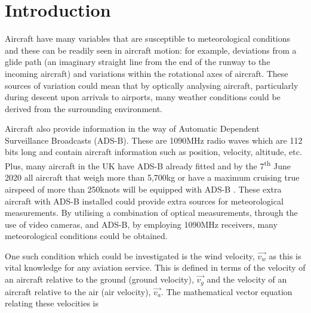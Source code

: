 \documentclass[11pt]{article}
\begin{document}
\newpage
\tableofcontents
\thispagestyle{empty} %
\twocolumn

\vspace{5mm} %





\setcounter{page}{1} %

\newpage


\section{Introduction}
\label{sec:introduction}

Aircraft have many variables that are susceptible to meteorological conditions and these can be readily seen in aircraft motion: for example, deviations from a glide path (an imaginary straight line from the end of the runway to the incoming aircraft) and variations within the rotational axes of aircraft. These sources of variation could mean that by optically analysing aircraft, particularly during descent upon arrivals to airports, many weather conditions could be derived from the surrounding environment.

Aircraft also provide information in the way of Automatic Dependent Surveillance Broadcasts (ADS-B). These are 1090MHz radio waves which are 112 bits long \cite{Book01} and contain aircraft information such as position, velocity, altitude, etc. Plus, many aircraft in the UK have ADS-B already fitted and by the 7\textsuperscript{th} June 2020 all aircraft that weigh more than 5,700kg or have a maximum cruising true airspeed of more than 250knots will be equipped with ADS-B \cite{Web03}. These extra aircraft with ADS-B installed could provide extra sources for meteorological measurements. By utilising a combination of optical measurements, through the use of video cameras, and ADS-B, by employing 1090MHz receivers, many meteorological conditions could be obtained.

One such condition which could be investigated is the wind velocity, $\Vec{v_w}$ as this is vital knowledge for any aviation service. This is defined in terms of the velocity of an aircraft relative to the ground (ground velocity), $\Vec{v_g}$ and the velocity of an aircraft relative to the air (air velocity), $\Vec{v_a}$. The mathematical vector equation relating these velocities is
\end{document}
